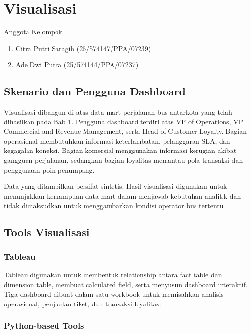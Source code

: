\chapter{Visualisasi}
\begin{mybox}{Anggota Kelompok}
\begin{enumerate}
    \itemsep0em
    \item Citra Putri Saragih (25/574147/PPA/07239)
    \item Ade Dwi Putra (25/574144/PPA/07237)
\end{enumerate}
\end{mybox}

\section{Skenario dan Pengguna Dashboard}

Visualisasi dibangun di atas data mart perjalanan bus antarkota yang telah
dihasilkan pada Bab 1. Pengguna dashboard terdiri atas VP of Operations, VP
Commercial and Revenue Management, serta Head of Customer Loyalty. Bagian
operasional membutuhkan informasi keterlambatan, pelanggaran SLA, dan kegagalan
koneksi. Bagian komersial menggunakan informasi kerugian akibat gangguan
perjalanan, sedangkan bagian loyalitas memantau pola transaksi dan penggunaan
poin penumpang.

Data yang ditampilkan bersifat sintetis. Hasil visualisasi digunakan untuk
menunjukkan kemampuan data mart dalam menjawab kebutuhan analitik dan tidak
dimaksudkan untuk menggambarkan kondisi operator bus tertentu.

\section{Tools Visualisasi}

\subsection{Tableau}

Tableau digunakan untuk membentuk relationship antara fact table dan dimension
table, membuat calculated field, serta menyusun dashboard interaktif. Tiga
dashboard dibuat dalam satu workbook untuk memisahkan analisis operasional,
penjualan tiket, dan transaksi loyalitas.

\subsection{Python-based Tools}


